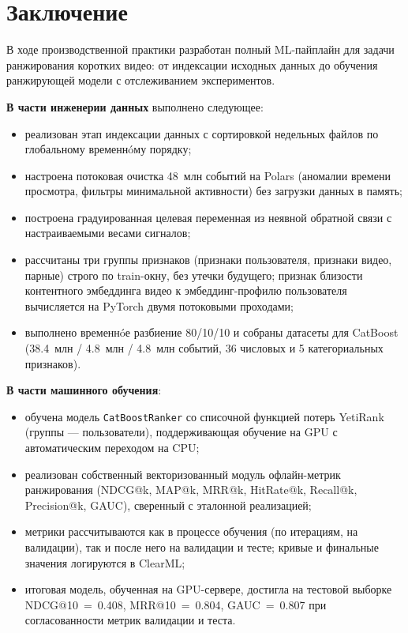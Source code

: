\section*{Заключение}

В ходе производственной практики разработан полный ML-пайплайн для задачи ранжирования коротких видео: от индексации исходных данных до обучения ранжирующей модели с отслеживанием экспериментов.

\textbf{В части инженерии данных} выполнено следующее:
\begin{itemize}
    \item реализован этап индексации данных с сортировкой недельных файлов по глобальному временнóму порядку;
    \item настроена потоковая очистка 48~млн событий на Polars (аномалии времени просмотра, фильтры минимальной активности) без загрузки данных в память;
    \item построена градуированная целевая переменная из неявной обратной связи с настраиваемыми весами сигналов;
    \item рассчитаны три группы признаков (признаки пользователя, признаки видео, парные) строго по train-окну, без утечки будущего; признак близости контентного эмбеддинга видео к эмбеддинг-профилю пользователя вычисляется на PyTorch двумя потоковыми проходами;
    \item выполнено временнóе разбиение 80/10/10 и собраны датасеты для CatBoost (38.4~млн / 4.8~млн / 4.8~млн событий, 36 числовых и 5 категориальных признаков).
\end{itemize}

\textbf{В части машинного обучения}:
\begin{itemize}
    \item обучена модель \texttt{CatBoostRanker} со списочной функцией потерь YetiRank (группы --- пользователи), поддерживающая обучение на GPU с автоматическим переходом на CPU;
    \item реализован собственный векторизованный модуль офлайн-метрик ранжирования (NDCG@k, MAP@k, MRR@k, HitRate@k, Recall@k, Precision@k, GAUC), сверенный с эталонной реализацией;
    \item метрики рассчитываются как в процессе обучения (по итерациям, на валидации), так и после него на валидации и тесте; кривые и финальные значения логируются в ClearML;
    \item итоговая модель, обученная на GPU-сервере, достигла на тестовой выборке NDCG@10~=~0.408, MRR@10~=~0.804, GAUC~=~0.807 при согласованности метрик валидации и теста.
\end{itemize}

